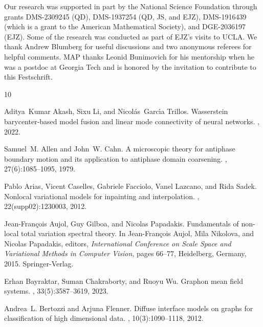 \documentclass[11pt]{amsart}
\numberwithin{equation}{section}
\begin{document}
Our research was supported in part by the National Science Foundation through grants DMS-2309245 (QD), DMS-1937254 (QD, JS, and EJZ), DMS-1916439 (which is a grant to the American Mathematical Society), and DGE-2036197 (EJZ). Some of the research was {conducted} as part of EJZ's visits to UCLA. We thank Andrew Blumberg for useful discussions and two anonymous referees for helpful comments. MAP thanks Leonid Bunimovich for his mentorship when he was a postdoc at Georgia Tech and is honored by the invitation to contribute to this Festschrift.





%
%


\begin{thebibliography}{10}

Aditya~Kumar Akash, Sixu Li, and Nicol{\'a}s~Garc{\'\i}a Trillos.
\newblock Wasserstein barycenter-based model fusion and linear mode
  connectivity of neural networks.
, 2022.

Samuel~M. Allen and John~W. Cahn.
\newblock A microscopic theory for antiphase boundary motion and its
  application to antiphase domain coarsening.
, 27(6):1085--1095, 1979.

Pablo Arias, Vicent Caselles, Gabriele Facciolo, Vanel Lazcano, and Rida Sadek.
\newblock Nonlocal variational models for inpainting and interpolation.
, 22(supp02):1230003, 2012.

Jean-Fran{\c{c}}ois Aujol, Guy Gilboa, and Nicolas Papadakis.
\newblock Fundamentals of non-local total variation spectral theory.
\newblock In Jean-Fran{\c{c}}ois Aujol, Mila Nikolova, and Nicolas Papadakis,
  editors, {\em International Conference on Scale Space and Variational Methods
  in Computer Vision}, pages 66--77, Heidelberg, Germany, 2015.
  Springer-Verlag.

Erhan Bayraktar, Suman Chakraborty, and Ruoyu Wu.
\newblock Graphon mean field systems.
, 33(5):3587--3619, 2023.

Andrea~L. Bertozzi and Arjuna Flenner.
\newblock Diffuse interface models on graphs for classification of high
  dimensional data.
, 10(3):1090--1118, 2012.


\end{thebibliography}
\end{document}
